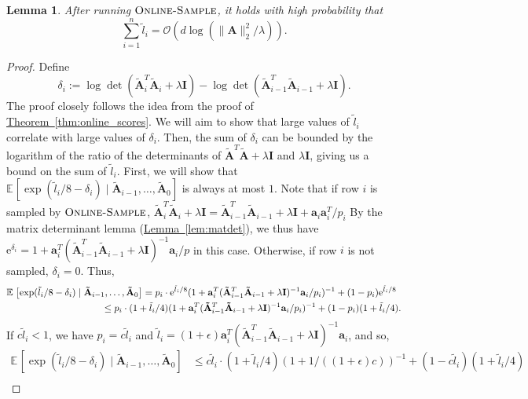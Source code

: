 \documentclass[11pt]{article}
\numberwithin{equation}{section}
\newtheorem{lemma}[theorem]{Lemma}
\theoremstyle{definition}
\theoremstyle{plain}
\newcommand{\eee}{\mathrm e}
\newcommand{\expref}[2]{\hyperref[#2]{#1~\ref{#2}}}
\newcommand{\Oh}{\ensuremath{\mathcal{O}}}
\newcommand{\bv}[1]{\mathbf{#1}}
\newcommand{\expct}[3]{\mathbb{E}_{{#1}_{#2}}\left[#3\right]}
\begin{document}
\begin{lemma}
    \label{lem:online-sample-fast}
    After running $\textsc{Online-Sample}$, it holds with high probability that
    $$
        \sum_{i=1}^n \tilde{l}_i = \Oh(d \log(\|\bv{A}\|_2^2 / \lambda)).
    $$
\end{lemma}
\begin{proof}
    Define
    $$
        \delta_i := \log \det(\bv{\tilde{A}}_i^T \bv{\tilde{A}}_i + \lambda \bv{I}) - \log \det(\bv{\tilde{A}}_{i-1}^T \bv{\tilde{A}}_{i-1} + \lambda \bv{I}).
    $$
    The proof closely follows the idea from the proof of \expref{Theorem}{thm:online_scores}.
    We will aim to show that large values of $\tilde{l}_i$ correlate with large values of $\delta_i$.
    Then, the sum of $\delta_i$ can be bounded by the logarithm of the ratio of the determinants of $\bv{\tilde{A}}^T\bv{\tilde{A}} + \lambda\bv{I}$ and $\lambda\bv{I}$, giving us a bound on the sum of $\tilde{l}_i$.
    First, we will show that $\expct{}{}{\exp(\tilde{l}_i/8 - \delta_i) \mid \bv{\tilde A}_{i-1},\ldots, \bv{\tilde A}_{0}}$ is always at most $1$.
   Note that if row $i$ is sampled by $\textsc{Online-Sample}$, $\bv{\tilde{A}}_i^T \bv{\tilde{A}}_i + \lambda \bv{I} =  \bv{\tilde{A}}_{i-1}^T \bv{\tilde{A}}_{i-1} + \lambda \bv{I} + \bv{a}_i \bv{a}_i^T/p_i$
     By the matrix determinant lemma (\expref{Lemma}{lem:matdet}), we thus have $\eee^{\delta_i} =  1+ \bv{a}_i^T (\bv{\tilde{A}}_{i-1}^T \bv{\tilde{A}}_{i-1} + \lambda \bv{I})^{-1} \bv{a}_i/p$ in this case. Otherwise, if row $i$ is not sampled, $\delta_i = 0$. Thus,
    \begin{align}\label{ok}
        \expct{}{}{\exp(\tilde{l}_i/8 - \delta_i)\mid \bv{\tilde A}_{i-1},\ldots, \bv{\tilde A}_{0}} &= p_i \cdot \eee^{\tilde{l}_i/8} (1 + \bv{a}_i^T (\bv{\tilde{A}}_{i-1}^T \bv{\tilde{A}}_{i-1} + \lambda \bv{I})^{-1} \bv{a}_i / p_i)^{-1} + (1 - p_i) \eee^{\tilde{l}_i/8}\nonumber\\
                                                    &\hspace{-4.3em}\leq p_i \cdot (1 + \tilde{l}_i/4) (1 + \bv{a}_i^T (\bv{\tilde{A}}_{i-1}^T \bv{\tilde{A}}_{i-1} + \lambda \bv{I})^{-1} \bv{a}_i / p_i)^{-1} + (1 - p_i) (1 + \tilde{l}_i/4).
    \end{align}
    If $c\tilde{l}_i < 1$, we have $p_i = c\tilde{l}_i$ and $\tilde{l}_i = (1+\epsilon)\bv{a}_i^T (\bv{\tilde{A}}_{i-1}^T \bv{\tilde{A}}_{i-1} + \lambda \bv{I})^{-1} \bv{a}_i$, and so,
    \begin{align*}
        \expct{}{}{\exp(\tilde{l}_i/8 - \delta_i) \mid \bv{\tilde A}_{i-1},\ldots, \bv{\tilde A}_{0}} &\leq c\tilde{l}_i \cdot (1 +\tilde{l}_i/4) (1 + 1 / ((1+\epsilon)c))^{-1} + (1 - c\tilde{l}_i) (1 + \tilde{l}_i/4)\\

\end{align*}
\end{proof}
\end{document}

